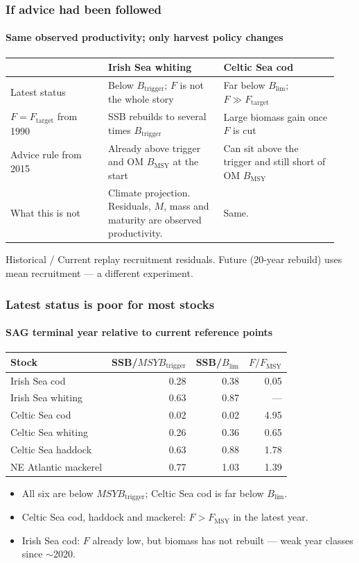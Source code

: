 \documentclass[
  aspectratio=169,
  t,
  onlytextwidth,
  10pt,
]{beamer}
\newcommand{\Fmsy}{F_{\mathrm{MSY}}}
\newcommand{\Blim}{B_{\lim}}
\newcommand{\Btrig}{MSYB_{\mathrm{trigger}}}
\begin{document}
\begin{frame}
  \frametitle{If advice had been followed}
  \framesubtitle{Same observed productivity; only harvest policy changes}

  {\footnotesize
  \begin{tabular}{@{}p{0.28\linewidth}p{0.33\linewidth}p{0.33\linewidth}@{}}
    \toprule
     & Irish Sea whiting & Celtic Sea cod \\
    \midrule
    Latest status
      & Below $B_{\mathrm{trigger}}$; $F$ is not the whole story
      & Far below $B_{\lim}$; $F\gg F_{\mathrm{target}}$ \\[0.6em]
    $F=F_{\mathrm{target}}$ from 1990
      & SSB rebuilds to several times $B_{\mathrm{trigger}}$
      & Large biomass gain once $F$ is cut \\[0.6em]
    Advice rule from 2015
      & Already above trigger and OM $B_{\mathrm{MSY}}$ at the start
      & Can sit above the trigger and still short of OM $B_{\mathrm{MSY}}$ \\[0.6em]
    What this is not
      & Climate projection. Residuals, $M$, mass and maturity are observed productivity.
      & Same. \\
    \bottomrule
  \end{tabular}}

  \vspace{0.5em}
  {\small Historical / Current replay recruitment residuals.
  Future (20-year rebuild) uses mean recruitment --- a different experiment.}
\end{frame}

\begin{frame}
  \frametitle{Latest status is poor for most stocks}
  \framesubtitle{SAG terminal year relative to current reference points}

  {\footnotesize
  \begin{tabular}{@{}lrrr@{}}
    \toprule
    Stock & SSB/$\Btrig$ & SSB/$\Blim$ & $F/\Fmsy$ \\
    \midrule
    Irish Sea cod        & 0.28 & 0.38 & 0.05 \\
    Irish Sea whiting    & 0.63 & 0.87 & --- \\
    Celtic Sea cod       & 0.02 & 0.02 & 4.95 \\
    Celtic Sea whiting   & 0.26 & 0.36 & 0.65 \\
    Celtic Sea haddock   & 0.63 & 0.88 & 1.78 \\
    NE Atlantic mackerel & 0.77 & 1.03 & 1.39 \\
    \bottomrule
  \end{tabular}}

  \vspace{0.5em}
  \begin{itemize}
    \item All six are below $\Btrig$; Celtic Sea cod is far below $\Blim$.
    \item Celtic Sea cod, haddock and mackerel: $F>\Fmsy$ in the latest year.
    \item Irish Sea cod: $F$ already low, but biomass has not rebuilt --- weak year classes since $\sim$2020.
  \end{itemize}
\end{frame}
\end{document}
